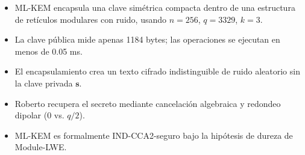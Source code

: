 \begin{resumencapitulo}
\begin{itemize}
  \item ML-KEM encapsula una clave simétrica compacta dentro de una estructura de retículos modulares con ruido, usando $n=256$, $q=3329$, $k=3$.
  \item La clave pública mide apenas 1184 bytes; las operaciones se ejecutan en menos de 0.05 ms.
  \item El encapsulamiento crea un texto cifrado indistinguible de ruido aleatorio sin la clave privada $\mathbf{s}$.
  \item Roberto recupera el secreto mediante cancelación algebraica y redondeo dipolar ($0$ vs. $q/2$).
  \item ML-KEM es formalmente IND-CCA2-seguro bajo la hipótesis de dureza de Module-LWE.
\end{itemize}
\end{resumencapitulo}
